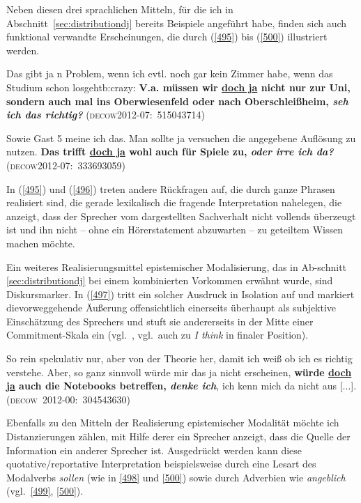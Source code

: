 Neben diesen drei sprachlichen Mitteln, für die ich in Abschnitt~\ref{sec:distributiondj} bereits Beispie\-le angeführt habe, finden sich auch funktional verwandte Erscheinungen, die durch (\ref{495}) bis (\ref{500}) illustriert werden.

\begin{exe}
	\ex\label{495} 

	Das gibt ja n Problem, wenn ich evtl. noch gar kein Zimmer habe, wenn das Studium schon losgehtb:crazy: \textbf{V.a. müssen wir \underline{doch ja} 		nicht nur zur Uni, sondern auch mal ins Oberwiesenfeld oder nach Oberschleißheim, \textit{seh ich das richtig?}}
	\hfill\hbox{\scshape(decow2012-07: 515043714)}	
\end{exe}

\begin{exe}
	\ex\label{496} 

	Sowie Gast 5 meine ich das. Man sollte ja versuchen die angegebene Auflösung zu nutzen. \textbf{Das trifft \underline{doch ja} wohl auch für Spiele 		zu, \textit{\textbf{oder irre ich da?}}}   
	\hfill\hbox{\scshape(decow2012-07: 333693059)}	
\end{exe}
In (\ref{495}) und (\ref{496}) treten andere Rückfragen  auf, die durch ganze Phrasen realisiert sind, die gerade lexikalisch die fragende Interpretation nahelegen, die anzeigt, dass der Sprecher vom dargestellten Sachverhalt nicht vollends überzeugt ist und ihn nicht – ohne ein Hörerstatement abzuwarten – zu geteiltem Wissen machen möchte. 

Ein weiteres Realisierungsmittel epistemischer Modalisierung, das in Ab-\linebreak schnitt \ref{sec:distributiondj} bei einem kombinierten Vorkommen erwähnt wurde, sind  Diskursmarker. In (\ref{497}) tritt ein solcher Ausdruck in Isolation auf und markiert die\linebreak vorweggehende Äußerung offensichtlich einerseits überhaupt als subjektive Einschätzung des Sprechers und stuft sie andererseits in der Mitte einer Commit\-ment-Skala ein (vgl.\ \citealt[18]{Aijmer1997}, vgl.\ auch \citeyear[24]{Aijmer1997} zu \textit{I think} in finaler Position).	%

\begin{exe}
	\ex\label{497} 

	So rein spekulativ nur, aber von der Theorie her, damit ich weiß ob ich es richtig verstehe. Aber, so ganz sinnvoll würde mir das ja nicht erscheinen, 	\textbf{würde \underline{doch ja} auch die Notebooks betreffen, \textit{denke ich}}, ich kenn mich da nicht aus [...].  
	\hfill\hbox{\scshape(decow 2012-00: 304543630)}	
\end{exe}
Ebenfalls zu den Mitteln der Realisierung epistemischer Modalität möchte ich Distanzierungen zählen, mit Hilfe derer ein Sprecher anzeigt, dass die Quelle der Information ein anderer Sprecher ist. Ausgedrückt werden kann diese  quotative/reportative Interpretation beispielsweise durch eine Lesart des Modalverbs \textit{sollen} (wie in \ref{498} und \ref{500}) sowie durch Adverbien wie \textit{angeblich} (vgl.\ \ref{499}, \ref{500}).

